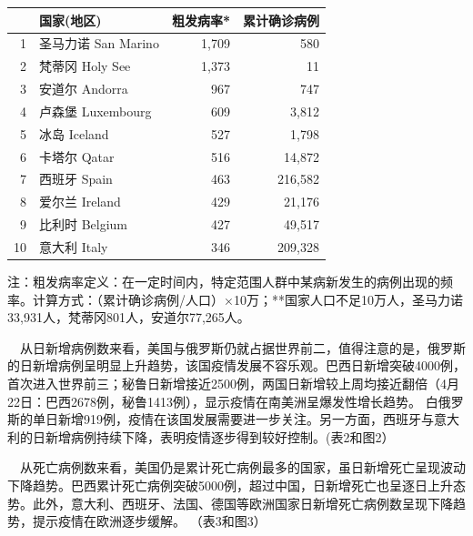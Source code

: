 \documentclass[]{article}
\begin{document}
\begin{table}[H]
\begin{minipage}{.7\linewidth}
\begin{table}[H]
\begin{tabular}{rlrr}
\toprule
  & 国家(地区) & 粗发病率* & 累计确诊病例\\
\midrule
\rowcolor{gray!6}  1 & 圣马力诺 San Marino & 1,709 & 580\\
2 & 梵蒂冈 Holy See & 1,373 & 11\\
\rowcolor{gray!6}  3 & 安道尔 Andorra & 967 & 747\\
4 & 卢森堡 Luxembourg & 609 & 3,812\\
\rowcolor{gray!6}  5 & 冰岛 Iceland & 527 & 1,798\\
6 & 卡塔尔 Qatar & 516 & 14,872\\
\rowcolor{gray!6}  7 & 西班牙 Spain & 463 & 216,582\\
8 & 爱尔兰 Ireland & 429 & 21,176\\
\rowcolor{gray!6}  9 & 比利时 Belgium & 427 & 49,517\\
10 & 意大利 Italy & 346 & 209,328\\
\bottomrule
\end{tabular}
\endgroup{}
\end{table} \end{minipage}
    \begin{tablenotes}
        \fontsize{15}{15}
        \selectfont
        \item 注：粗发病率定义：在一定时间内，特定范围人群中某病新发生的病例出现的频率。计算方式：（累计确诊病例/人口）×10万；**国家人口不足10万人，圣马力诺33,931人，梵蒂冈801人，安道尔77,265人。  %
      \end{tablenotes}
\end{table}

\(\quad\)从日新增病例数来看，美国与俄罗斯仍就占据世界前二，值得注意的是，俄罗斯的日新增病例呈明显上升趋势，该国疫情发展不容乐观。巴西日新增突破4000例，首次进入世界前三；秘鲁日新增接近2500例，两国日新增较上周均接近翻倍（4月22日：巴西2678例，秘鲁1413例），显示疫情在南美洲呈爆发性增长趋势。
白俄罗斯的单日新增919例，疫情在该国发展需要进一步关注。另一方面，西班牙与意大利的日新增病例持续下降，表明疫情逐步得到较好控制。(表2和图2）

\(\quad\)从死亡病例数来看，美国仍是累计死亡病例最多的国家，虽日新增死亡呈现波动下降趋势。巴西累计死亡病例突破5000例，超过中国，日新增死亡也呈逐日上升态势。此外，意大利、西班牙、法国、德国等欧洲国家日新增死亡病例数呈现下降趋势，提示疫情在欧洲逐步缓解。
（表3和图3）
\end{document}
